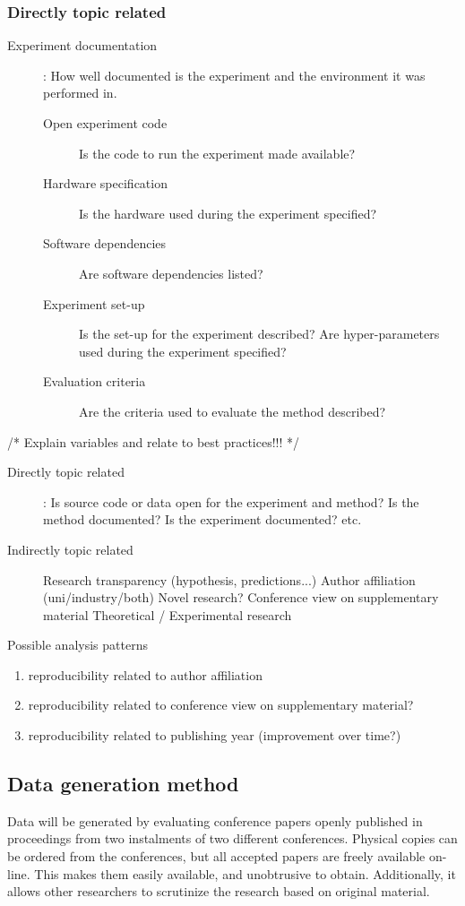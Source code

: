 \subsubsection{Directly topic related}
\begin{description}
\item[Experiment documentation]: How well documented is the experiment and the environment it was performed in.
    \begin{description}
    \item[Open experiment code] Is the code to run the experiment made available?
    \item[Hardware specification] Is the hardware used during the experiment specified?
    \item[Software dependencies] Are software dependencies listed?
    \item[Experiment set-up] Is the set-up for the experiment described? Are hyper-parameters used during the experiment specified?
    \item[Evaluation criteria] Are the criteria used to evaluate the method described?
    \end{description}
\end{description}
/* Explain variables and relate to best practices!!! */
\begin{description}
\item[Directly topic related]:
        Is source code or data open for the experiment and method?
        Is the method documented?
        Is the experiment documented?
        etc.
\item[Indirectly topic related]
        Research transparency (hypothesis, predictions...)
        Author affiliation (uni/industry/both)
        Novel research?
        Conference view on supplementary material
        Theoretical / Experimental research

\end{description}

Possible analysis patterns
\begin{enumerate}
    \item reproducibility related to author affiliation
    \item reproducibility related to conference view on supplementary material?
    \item reproducibility related to publishing year (improvement over time?)

\end{enumerate}

\subsection{Data generation method}
Data will be generated by evaluating conference papers openly published in proceedings from two instalments of two different conferences. Physical copies can be ordered from the conferences, but all accepted papers are freely available on-line. This makes them easily available, and unobtrusive to obtain. Additionally, it allows other researchers to scrutinize the research based on original material.

